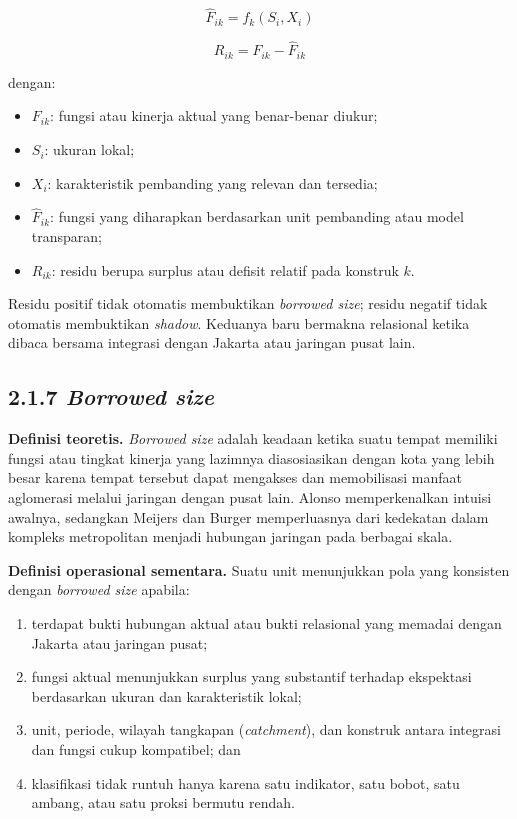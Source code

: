 \documentclass[
  indonesian,
  11pt,
  a4paper,
  oneside,
  openany]{report}
\providecommand{\tightlist}{%
  \setlength{\itemsep}{0pt}\setlength{\parskip}{0pt}}
\begin{document}
\[
\widehat{F}_{ik}=f_k(S_i,X_i)
\]

\[
R_{ik}=F_{ik}-\widehat{F}_{ik}
\]

dengan:

\begin{itemize}
\tightlist
\item
  \(F_{ik}\): fungsi atau kinerja aktual yang benar-benar diukur;
\item
  \(S_i\): ukuran lokal;
\item
  \(X_i\): karakteristik pembanding yang relevan dan tersedia;
\item
  \(\widehat{F}_{ik}\): fungsi yang diharapkan berdasarkan unit
  pembanding atau model transparan;
\item
  \(R_{ik}\): residu berupa surplus atau defisit relatif pada konstruk
  \(k\).
\end{itemize}

Residu positif tidak otomatis membuktikan \emph{borrowed size}; residu
negatif tidak otomatis membuktikan \emph{shadow}. Keduanya baru bermakna
relasional ketika dibaca bersama integrasi dengan Jakarta atau jaringan
pusat lain.

\subsection{\texorpdfstring{2.1.7 \emph{Borrowed
size}}{2.1.7 Borrowed size}}\label{borrowed-size}

\textbf{Definisi teoretis.} \emph{Borrowed size} adalah keadaan ketika
suatu tempat memiliki fungsi atau tingkat kinerja yang lazimnya
diasosiasikan dengan kota yang lebih besar karena tempat tersebut dapat
mengakses dan memobilisasi manfaat aglomerasi melalui jaringan dengan
pusat lain. Alonso memperkenalkan intuisi awalnya, sedangkan Meijers dan
Burger memperluasnya dari kedekatan dalam kompleks metropolitan menjadi
hubungan jaringan pada berbagai skala.

\textbf{Definisi operasional sementara.} Suatu unit menunjukkan pola
yang konsisten dengan \emph{borrowed size} apabila:

\begin{enumerate}
\def\labelenumi{\arabic{enumi}.}
\tightlist
\item
  terdapat bukti hubungan aktual atau bukti relasional yang memadai
  dengan Jakarta atau jaringan pusat;
\item
  fungsi aktual menunjukkan surplus yang substantif terhadap ekspektasi
  berdasarkan ukuran dan karakteristik lokal;
\item
  unit, periode, wilayah tangkapan (\emph{catchment}), dan konstruk
  antara integrasi dan fungsi cukup kompatibel; dan
\item
  klasifikasi tidak runtuh hanya karena satu indikator, satu bobot, satu
  ambang, atau satu proksi bermutu rendah.
\end{enumerate}
\end{document}

